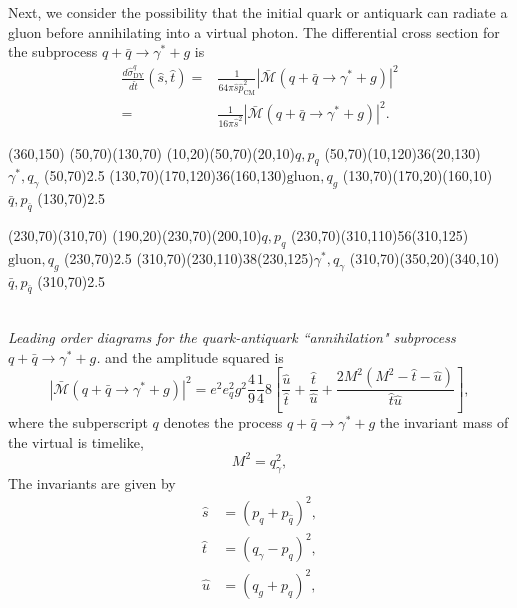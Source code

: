 Next, we consider the possibility that the initial quark or antiquark can radiate a gluon before annihilating into a virtual photon. The differential cross section for the subprocess $q+\bar{q}\to\gamma^\ast+g$ is 
\begin{align}
\frac{d\hat{\sigma}^q_\text{DY}}{d\hat{t}}(\hat{s},\hat{t})=&\frac{1}{64\pi\hat{s}\hat{p}^2_\text{CM}}\left| \bar{\mathcal{M}}(q+\bar{q}\to\gamma^\ast+g) \right|^2\nonumber\\
=&\frac{1}{16\pi\hat{s}^2}\left| \bar{\mathcal{M}}(q+\bar{q}\to\gamma^\ast+g) \right|^2.
\end{align}
\begin{axopicture}(360,150) 
	\Line[arrow](50,70)(130,70)
	\Line[arrow](10,20)(50,70)\Text(20,10){$q,p_q$}
	\Photon(50,70)(10,120){3}{6}\Text(20,130){$\gamma^\ast,q_\gamma$}
	\Vertex(50,70){2.5}
	\Gluon(130,70)(170,120){3}{6}\Text(160,130){$\text{gluon},q_g$}
	\Line[arrow](130,70)(170,20)\Text(160,10){$\bar{q},p_{\bar{q}}$}
	\Vertex(130,70){2.5}
	
	\Line[arrow](230,70)(310,70)
	\Line[arrow](190,20)(230,70)\Text(200,10){$q,p_q$}
	\Gluon(230,70)(310,110){5}{6}\Text(310,125){$\text{gluon},q_g$}
	\Vertex(230,70){2.5}
	\Photon(310,70)(230,110){3}{8}\Text(230,125){$\gamma^\ast,q_\gamma$}
	\Line[arrow](310,70)(350,20)\Text(340,10){$\bar{q},p_{\bar{q}}$}
	\Vertex(310,70){2.5}	
\end{axopicture}
\\ {\sl Leading order diagrams for the quark-antiquark ``annihilation" subprocess $q+\bar{q}\to\gamma^\ast+g$.}
\newline\newline\newline	
and the amplitude squared is
\begin{equation}
\left| \bar{\mathcal{M}}(q+\bar{q}\to\gamma^\ast+g) \right|^2=e^2e_q^2g^2\frac{4}{9}\frac{1}{4}8\left[ \frac{\hat{u}}{\hat{t}}+\frac{\hat{t}}{\hat{u}}+\frac{2M^2(M^2-\hat{t}-\hat{u})}{\hat{t}\hat{u}} \right],
\end{equation}
where the subperscript $q$ denotes the process $q+\bar{q}\to\gamma^\ast+g$ the invariant mass of the virtual is timelike,
\begin{equation}
M^2=q^2_\gamma,
\end{equation}
The invariants are given by
\begin{align}
\hat{s}&=(p_q+p_{\hat{q}})^2,\nonumber\\
\hat{t}&=(q_\gamma-p_{q})^2,\nonumber\\
\hat{u}&=(q_g+p_{q})^2,
\end{align}
